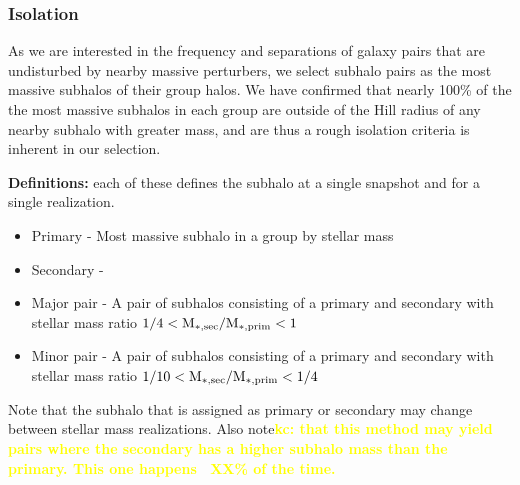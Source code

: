 \documentclass[twocolumn]{aastex631}
\newcommand{\kc}[1]{\textcolor{yellow}{\textbf{kc: #1}} }
\begin{document}
\subsubsection{Isolation}
As we are interested in the frequency and separations of galaxy pairs that are undisturbed by nearby massive perturbers, we select subhalo pairs as the most massive subhalos of their group halos. 
We have confirmed that nearly 100\% of the the most massive subhalos in each group are outside of the Hill radius of any nearby subhalo with greater mass, and are thus a rough isolation criteria is inherent in our selection.

\textbf{Definitions:} each of these defines the subhalo at a single snapshot and for a single realization.
\begin{itemize}
  \item Primary - Most massive subhalo in a group by stellar mass
  \item Secondary - 
  \item Major pair - A pair of subhalos consisting of a primary and secondary with stellar mass ratio $1/4 < \rm M_{*,sec}/M_{*, prim} < 1$
  \item Minor pair - A pair of subhalos consisting of a primary and secondary with stellar mass ratio $1/10 < \rm M_{*,sec}/M_{*, prim} < 1/4$
\end{itemize}
Note that the subhalo that is assigned as primary or secondary may change between stellar mass realizations. Also note\kc{that this method may yield pairs where the secondary has a higher subhalo mass than the primary. This one happens ~XX\% of the time.}
\end{document}
